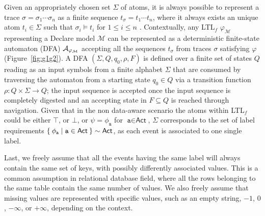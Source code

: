 Given an appropriately chosen set $\Sigma$ of atoms, it is always possible to represent a trace $\sigma=\sigma_1\cdots \sigma_n$ as a finite sequence $t_\sigma=t_1\cdots t_n$, where it always exists an unique atom $t_i\in\Sigma$ such that $\sigma_i\vDash t_i$ for $1\leq i\leq n$ \cite{XuLZ17a,MaggiMCA18}.
Contextually,  any LTL$_f$ $\varphi_{\mathcal{M}}$ representing a Declare model $\mathcal{M}$ can be represented as a deterministic finite-state automaton (DFA) $\mathcal{A}_{\varphi_{\tiny\mathcal{M}}}$ \cite{Westergaard11,Lydia} accepting all the sequences $t_\sigma$ from traces $\sigma$ satisfying $\varphi$ (Figure~\ref{fig:g1g2}). A DFA  $(\Sigma,Q,q_0,\rho,F)$ is defined \cite{0016921} over a finite set of states $Q$ reading as an input symbols from a finite alphabet $\Sigma$ that are consumed by traversing the automaton from a starting state $q_0\in Q$ via a transition function $\rho\colon Q\times \Sigma\to Q$; the input sequence is accepted once the input sequence is completely digested and an accepting state in $F\subseteq Q$ is reached through navigation. Given that in the non data-aware scenario the atoms within LTL$_f$ could be either $\top$, or $\bot$, or $\psi=\phi_\texttt{a}$ for $\texttt{a}\in\textsf{Act}$, $\Sigma$ corresponds to the set of label requirements $\Set{\phi_\texttt{a}|\texttt{a}\in\textsf{Act}}\sim\textsf{Act}$, as each event is associated to one single label.

Last, we freely assume that all the events having the same label will always contain the same set of keys, with possibly differently associated values. This is a common assumption in relational database field, where all the rows belonging to the same table contain the same number of values. We also freely assume that missing values are represented with specific values, such as an empty string, $-1$, $0$, $-\infty$, or $+\infty$, depending on the context. 